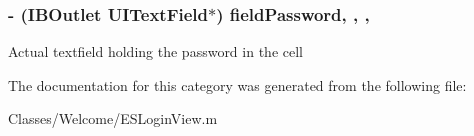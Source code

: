 \subsubsection[{field\+Password}]{\setlength{\rightskip}{0pt plus 5cm}-\/ (I\+B\+Outlet U\+I\+Text\+Field$\ast$) field\+Password\hspace{0.3cm}{\ttfamily [read]}, {\ttfamily [write]}, {\ttfamily [nonatomic]}, {\ttfamily [strong]}}\label{category_e_s_login_view_07_08_a9c06e566742c5efce7636e4a7e65f07f}
Actual textfield holding the password in the cell 

The documentation for this category was generated from the following file\+:\begin{DoxyCompactItemize}
\item 
Classes/\+Welcome/E\+S\+Login\+View.\+m\end{DoxyCompactItemize}
